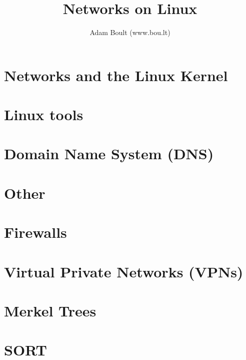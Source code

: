 \documentclass[oneside]{book}
\begin{document}
\author{Adam Boult (www.bou.lt)}
\title{Networks on Linux}
\maketitle

\setcounter{tocdepth}{0}
\tableofcontents



\part{Networks and the Linux Kernel}

\part{Linux tools}






\part{Domain Name System (DNS)}




\part{Other}






\part{Firewalls}


\part{Virtual Private Networks (VPNs)}


\part{Merkel Trees}


\part{SORT}

\end{document}

